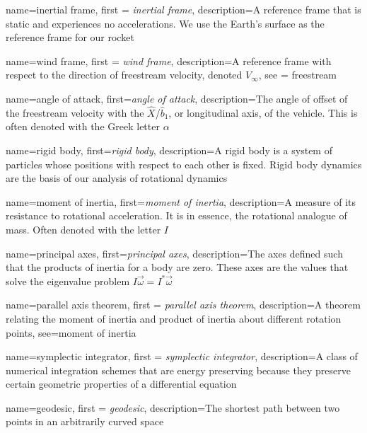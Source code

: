 {
    name=inertial frame,
    first = {\textit{inertial frame}},
    description={A reference frame that is static and experiences no accelerations. We use the Earth's surface as the reference frame for our rocket}
}

{
    name=wind frame,
    first = {\textit{wind frame}},
    description={A reference frame with respect to the direction of freestream velocity, denoted $V_{\infty}$},
    see = {freestream}
}


{
    name=angle of attack,
    first={\textit{angle of attack}},
    description={The angle of offset of the freestream velocity with the $\hat{X}$/$\hat{b}_1$, or longitudinal axis, of the vehicle. This is often denoted with the Greek letter $\alpha$}
}

{
    name=rigid body,
    first=\textit{rigid body},
    description={A rigid body is a system of particles whose positions with respect to each other is fixed. Rigid body dynamics are the basis of our analysis of rotational dynamics}
}

{
    name=moment of inertia,
    first={\textit{moment of inertia}},
    description={A measure of its resistance to rotational acceleration. It is in essence, the rotational analogue of mass. Often denoted with the letter $I$}
}

{
    name={principal axes},
    first=\textit{principal axes},
    description={The axes defined such that the products of inertia for a body are zero. These axes are the values that solve the eigenvalue problem $I\vec{\omega}=I^*\vec{\omega}$}
}

{
    name=parallel axis theorem,
    first = {\textit{parallel axis theorem}},
    description={A theorem relating the moment of inertia and product of inertia about different rotation points},
    see={moment of inertia}
}

{
    name=symplectic integrator,
    first = {\textit{symplectic integrator}},
    description={A class of numerical integration schemes that are energy preserving because they preserve certain geometric properties of a differential equation}
}

{
    name=geodesic,
    first = {\textit{geodesic}},
    description={The shortest path between two points in an arbitrarily curved space}
}

